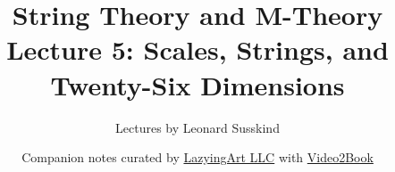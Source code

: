\documentclass[11pt,oneside]{book}
\begin{document}
\hypersetup{pageanchor=false}
\frontmatter
\title{String Theory and M-Theory\\[0.45em]
\large Lecture 5: Scales, Strings, and Twenty-Six Dimensions}
\author{Lectures by Leonard Susskind}
\date{Companion notes curated by
\href{https://lazying.art}{LazyingArt LLC} with
\href{https://github.com/lachlanchen/Video2Book}{Video2Book}}
\maketitle
\clearpage
\hypersetup{pageanchor=true}
\mainmatter

\end{document}
